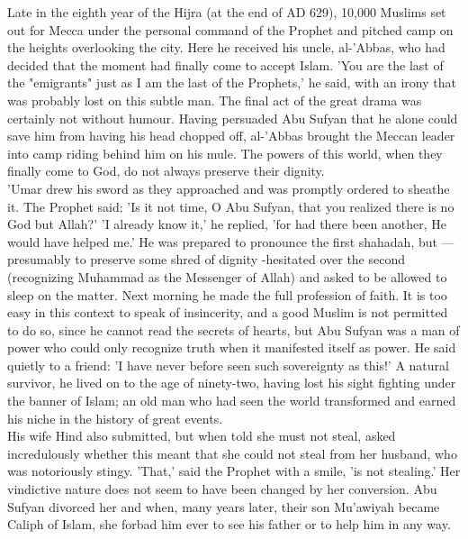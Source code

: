 \documentclass[11pt, b5paper, twoside]{book}
\begin{document}
Late in the eighth year of the Hijra (at the end of AD 629), 10,000 Muslims set out for Mecca under 
the personal command of the Prophet and pitched camp on the heights overlooking the city. Here he 
received his uncle, al-'Abbas, who had decided that the moment had finally come to accept Islam. 'You 
are the last of the "emigrants" just as I am the last of the Prophets,' he said, with an irony that 
was probably lost on this subtle man. The final act of the great drama was certainly not without 
humour. Having persuaded Abu Sufyan that he alone could save him from having his head chopped off, 
al-'Abbas brought the Meccan leader into camp riding behind him on his mule. The powers of this 
world, when they finally come to God, do not always preserve their dignity. \\

'Umar drew his sword as they approached and was promptly ordered to sheathe it. The Prophet said: 'Is 
it not time, O Abu Sufyan, that you realized there is no God but Allah?' 'I already know it,' he 
replied, 'for had there been another, He would have helped me.' He was prepared to pronounce the 
first shahadah, but --- presumably to preserve some shred of dignity -hesitated over the second 
(recognizing Muhammad as the Messenger of Allah) and asked to be allowed to sleep on the matter. Next 
morning he made the full profession of faith. It is too easy in this context to speak of insincerity, 
and a good Muslim is not permitted to do so, since he cannot read the secrets of hearts, but Abu 
Sufyan was a man of power who could only recognize truth when it manifested itself as power. He said 
quietly to a friend: 'I have never before seen such sovereignty as this!' A natural survivor, he 
lived on to the age of ninety-two, having lost his sight fighting under the banner of Islam; an old 
man who had seen the world transformed and earned his niche in the history of great events. \\

His wife Hind also submitted, but when told she must not steal, asked incredulously whether this 
meant that she could not steal from her husband, who was notoriously stingy. 'That,' said the Prophet 
with a smile, 'is not stealing.' Her vindictive nature does not seem to have been changed by her 
conversion. Abu Sufyan divorced her and when, many years later, their son Mu'awiyah became Caliph of 
Islam, she forbad him ever to see his father or to help him in any way. \\
\end{document}
